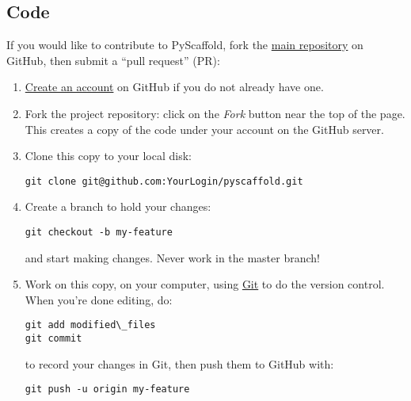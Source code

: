 \documentclass[letterpaper,10pt,english]{sphinxmanual}
\begin{document}
\subsection{Code}
\label{contrib:code}
If you would like to contribute to PyScaffold, fork the \href{https://github.com/blue-yonder/pyscaffold/}{main repository} on GitHub, then submit a
“pull request” (PR):
\begin{enumerate}
\item {} 
\href{https://github.com/signup/free}{Create an account} on GitHub if you do
not already have one.

\item {} 
Fork the project repository: click on the \emph{Fork} button near the top of the
page. This creates a copy of the code under your account on the GitHub server.

\item {} 
Clone this copy to your local disk:

\begin{Verbatim}[commandchars=\\\{\}]
git clone git@github.com:YourLogin/pyscaffold.git
\end{Verbatim}

\item {} 
Create a branch to hold your changes:

\begin{Verbatim}[commandchars=\\\{\}]
git checkout -b my-feature
\end{Verbatim}

and start making changes. Never work in the master branch!

\item {} 
Work on this copy, on your computer, using \href{http://git-scm.com/}{Git} to
do the version control. When you’re done editing, do:

\begin{Verbatim}[commandchars=\\\{\}]
git add modified\_files
git commit
\end{Verbatim}

to record your changes in Git, then push them to GitHub with:

\begin{Verbatim}[commandchars=\\\{\}]
git push -u origin my-feature
\end{Verbatim}

\end{enumerate}
\end{document}
